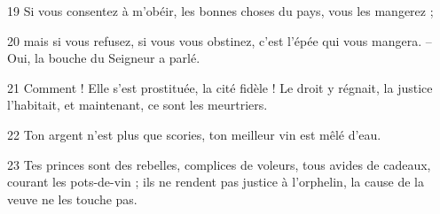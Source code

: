 
19 Si vous consentez à m’obéir, les bonnes choses du pays, vous les mangerez ;

20 mais si vous refusez, si vous vous obstinez, c’est l’épée qui vous mangera. – Oui, la bouche du Seigneur a parlé.

21 Comment ! Elle s’est prostituée, la cité fidèle ! Le droit y régnait, la justice l’habitait, et maintenant, ce sont les meurtriers.

22 Ton argent n’est plus que scories, ton meilleur vin est mêlé d’eau.

23 Tes princes sont des rebelles, complices de voleurs, tous avides de cadeaux, courant les pots-de-vin ; ils ne rendent pas justice à l’orphelin, la cause de la veuve ne les touche pas.
